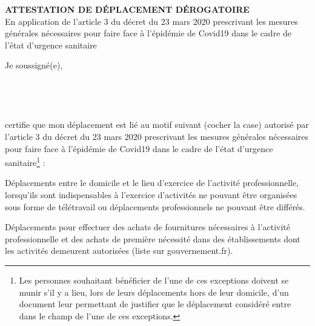 \documentclass[12pt,a4paper]{article}
\begin{document}
\begin{Form}

\begin{center}
	\textbf{\uppercase{Attestation de déplacement dérogatoire}} \\
	En application de l'article 3 du décret du 23 mars 2020 prescrivant les mesures générales
	nécessaires pour faire face à l'épidémie de Covid19 dans le cadre de l'état d'urgence sanitaire 
\end{center}

Je soussigné(e), \\

 \\
 \\
 \\
 \\

certifie que mon déplacement est lié au motif suivant (cocher la case) autorisé par l'article 3
du décret du 23 mars 2020 prescrivant les mesures générales nécessaires pour faire face à
l'épidémie de Covid19 dans le cadre de l'état d'urgence sanitaire\footnote{Les personnes
souhaitant bénéficier de l'une de ces exceptions doivent se munir s'il y a lieu, lors de leurs
déplacements hors de leur domicile, d'un document leur permettant de justifier que le déplacement
considéré entre dans le champ de l'une de ces exceptions.} :\\

\begin{minipage}{0.1\textwidth}
	\CheckBox[bordercolor=black]{}
\end{minipage}
\begin{minipage}{0.89\textwidth}
	Déplacements entre le domicile et le lieu d'exercice de l'activité professionnelle,
	lorsqu'ils sont indispensables à l'exercice d'activités ne pouvant être organisées sous
	forme de télétravail ou déplacements professionnels ne pouvant être différés\footnotemark.
\end{minipage}

\vspace{5mm}

\begin{minipage}{0.1\textwidth}
	\CheckBox[bordercolor=black]{}
\end{minipage}
\begin{minipage}{0.89\textwidth}
	Déplacements pour effectuer des achats de fournitures nécessaires à l’activité
	professionnelle et des achats de première nécessité\footnotemark{} dans des établissements dont les
	activités demeurent autorisées (liste sur gouvernement.fr).
\end{minipage}
	

\end{Form}
\end{document}
